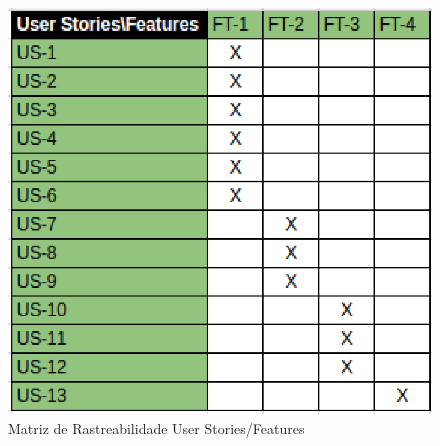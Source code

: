 \tab \\ \\ \\ \\ \\ 

\begin{figure}[h]
    \centering
    \label{fig01}
        \includegraphics[keepaspectratio=true,scale=0.9]{figuras/RallyDev/matriz2.eps}
    \caption{Matriz de Rastreabilidade User Stories/Features}
\end{figure}

